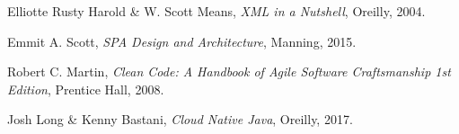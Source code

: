\begin{thebibliography}{9}

  Elliotte Rusty Harold \& W. Scott Means,
  \textit{XML in a Nutshell},
  Oreilly,
  2004.

  Emmit A. Scott,
  \textit{SPA Design and Architecture},
  Manning,
  2015.

  Robert C. Martin,
  \textit{Clean Code: A Handbook of Agile Software Craftsmanship 1st Edition},
  Prentice Hall,
  2008.

  Josh Long \& Kenny Bastani,
  \textit{Cloud Native Java},
  Oreilly,
  2017.
\end{thebibliography}
